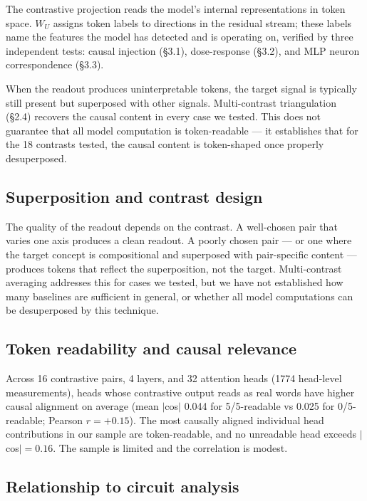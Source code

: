 \documentclass[11pt]{article}
\newcommand{\WU}{W_U}
\begin{document}
The contrastive projection reads the model's internal representations in
token space. $\WU$ assigns token labels to directions in the residual
stream; these labels name the features the model has detected and is
operating on, verified by three independent tests: causal injection
(\S3.1), dose-response (\S3.2), and MLP neuron correspondence (\S3.3).

When the readout produces uninterpretable tokens, the target signal is
typically still present but superposed with other signals. Multi-contrast
triangulation (\S2.4) recovers the causal content in every case we tested.
This does not guarantee that all model computation is token-readable --- it
establishes that for the 18 contrasts tested, the causal content is
token-shaped once properly desuperposed.

\subsection{Superposition and contrast design}

The quality of the readout depends on the contrast. A well-chosen pair
that varies one axis produces a clean readout. A poorly chosen pair --- or
one where the target concept is compositional and superposed with
pair-specific content --- produces tokens that reflect the superposition,
not the target. Multi-contrast averaging addresses this for cases we tested,
but we have not established how many baselines are sufficient in general,
or whether all model computations can be desuperposed by this technique.

\subsection{Token readability and causal relevance}

Across 16 contrastive pairs, 4 layers, and 32 attention heads (1774
head-level measurements), heads whose contrastive output reads as real
words have higher causal alignment on average (mean $|$cos$|$ 0.044 for
5/5-readable vs 0.025 for 0/5-readable; Pearson $r = +0.15$). The most
causally aligned individual head contributions in our sample are
token-readable, and no unreadable head exceeds $|$cos$| = 0.16$. The sample
is limited and the correlation is modest.

\subsection{Relationship to circuit analysis}
\end{document}
